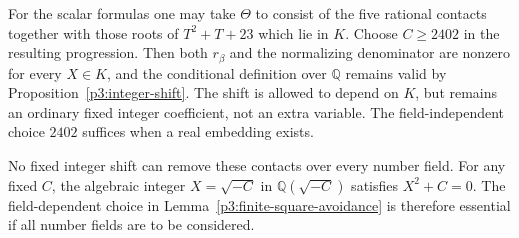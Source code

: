 For the scalar formulas one may take $\Theta$ to consist of the
five rational contacts together with those roots of
$T^2+T+23$ which lie in $K$. Choose $C\ge2402$ in the
resulting progression. Then both $r_\beta$ and the normalizing
denominator are nonzero for every $X\in K$, and the conditional
definition over $\mathbb Q$ remains valid by
Proposition~\ref{p3:integer-shift}. The shift is allowed to depend
on $K$, but remains an ordinary fixed integer coefficient, not
an extra variable. The field-independent choice $2402$ suffices
when a real embedding exists.

No fixed integer shift can remove these contacts over every number
field. For any fixed $C$, the algebraic integer $X=\sqrt{-C}$ in
$\mathbb Q(\sqrt{-C})$ satisfies $X^2+C=0$. The field-dependent
choice in Lemma~\ref{p3:finite-square-avoidance} is therefore
essential if all number fields are to be considered.
